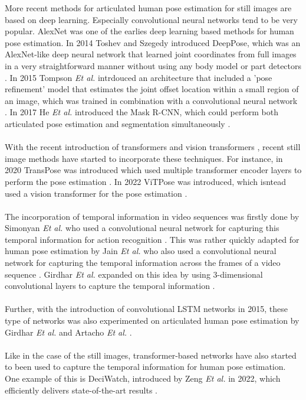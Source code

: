 \documentclass[./main.tex]{subfiles}
\begin{document}
More recent methods for articulated human pose estimation for still images are based on deep learning. Especially convolutional neural networks \cite{lecun1995convolutional} tend to be very popular. AlexNet \cite{krizhevsky2017imagenet} was one of the earlies deep learning based methods for human pose estimation. In 2014 Toshev and Szegedy introduced DeepPose, which was an AlexNet-like deep neural network that learned joint coordinates from full images in a very straightforward manner without using any body model or part detectors \cite{Toshev_2014, Chen_2020}. In 2015 Tompson \textit{Et al.} intrdouced an architecture that included a 'pose refinement' model that estimates the joint offset location within a small region of an image, which was trained in combination with a convolutional neural network \cite{tompson2015efficient}. In 2017 He \textit{Et al.} introduced the Mask R-CNN, which could perform both articulated pose estimation and segmentation simultaneously \cite{https://doi.org/10.48550/arxiv.1703.06870}.
\\
\\
With the recent introduction of transformers \cite{https://doi.org/10.48550/arxiv.1706.03762} and vision transformers \cite{dosovitskiy2021image}, recent still image methods have started to incorporate these techniques. For instance, in 2020 TransPose was introduced which used multiple transformer encoder layers to perform the pose estimation \cite{https://doi.org/10.48550/arxiv.2012.14214}. In 2022 ViTPose was introduced, which isntead used a vision transformer for the pose estimation \cite{https://doi.org/10.48550/arxiv.2204.12484}.
\\
\\
The incorporation of temporal information in video sequences was firstly done by Simonyan \textit{Et al.} who used a convolutional neural network for capturing this temporal information for action recognition \cite{simonyan2014twostream}. This was rather quickly adapted for human pose estimation by Jain \textit{Et al.} who also used a convolutional neural network for capturing the temporal information across the frames of a video sequence \cite{https://doi.org/10.48550/arxiv.1506.02897, jain2014modeep}. Girdhar \textit{Et al.} expanded on this idea by using 3-dimensional convolutional layers to capture the temporal information \cite{https://doi.org/10.48550/arxiv.1712.09184}.
\\
\\
Further, with the introduction of convolutional LSTM networks \cite{conv_lstm} in 2015, these type of networks was also experimented on articulated human pose estimation by Girdhar \textit{Et al.} \cite{https://doi.org/10.48550/arxiv.1712.09184} and Artacho \textit{Et al.} \cite{https://doi.org/10.48550/arxiv.2001.08095}.
\\
\\
Like in the case of the still images, transformer-based networks have also started to been used to capture the temporal information for human pose estimation. One example of this is DeciWatch, introduced by Zeng \textit{Et al.} in 2022, which efficiently delivers state-of-the-art results \cite{https://doi.org/10.48550/arxiv.2203.08713}.
\end{document}
